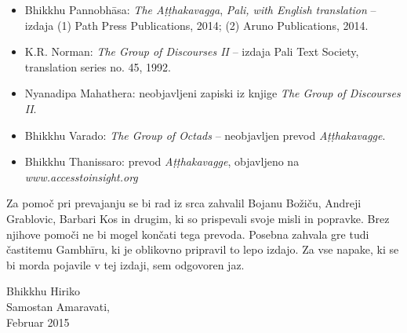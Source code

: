\begin{itemize}
\item
  Bhikkhu Pannobhāsa: \emph{The Aṭṭhakavagga}, \emph{Pali, with English
  translation} -- izdaja (1) Path Press Publications, 2014; (2) Aruno
  Publications, 2014.
\item
  K.R. Norman: \emph{The Group of Discourses II} -- izdaja Pali Text
  Society, translation series no. 45, 1992.
\item
  Nyanadipa Mahathera: neobjavljeni zapiski iz knjige \emph{The Group of
  Discourses II}.
\item
  Bhikkhu Varado: \emph{The Group of Octads} -- neobjavljen prevod
  \emph{Aṭṭhakavagge}.
\item
  Bhikkhu Thanissaro: prevod \emph{Aṭṭhakavagge}, objavljeno na \emph{www.accesstoinsight.org}
\end{itemize}

Za pomoč pri prevajanju se bi rad iz srca zahvalil Bojanu Božiču,
Andreji Grablovic, Barbari Kos in drugim, ki so prispevali svoje misli
in popravke. Brez njihove pomoči ne bi mogel končati tega prevoda.
Posebna zahvala gre tudi častitemu Gambhīru, ki je oblikovno pripravil
to lepo izdajo. Za vse napake, ki se bi morda pojavile v tej izdaji, sem
odgovoren jaz.

\bigskip

{\raggedleft
Bhikkhu Hiriko\\
Samostan Amaravati,\\
Februar 2015
\par}
